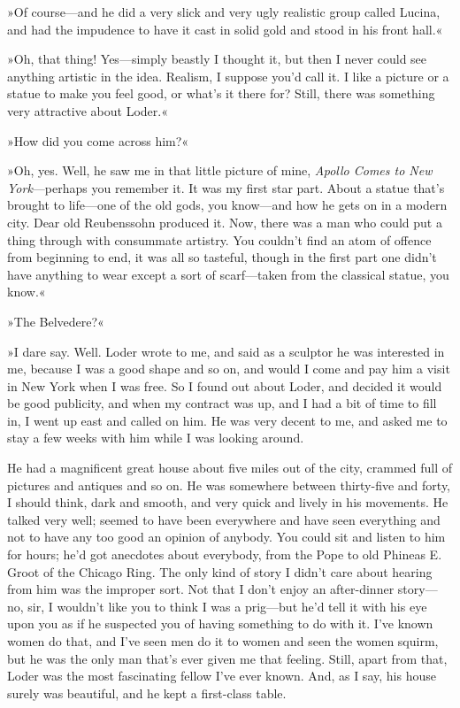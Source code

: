 »Of course—and he did a very slick and very ugly realistic group called Lucina, and had the impudence to have it cast in solid gold and stood in his front hall.«

»Oh, that thing! Yes—simply beastly I thought it, but then I never could see anything artistic in the idea. Realism, I suppose you'd call it. I like a picture or a statue to make you feel good, or what's it there for? Still, there was something very attractive about Loder.«

»How did you come across him?«

»Oh, yes. Well, he saw me in that little picture of mine, \textit{Apollo Comes to New York}—perhaps you remember it. It was my first star part. About a statue that's brought to life—one of the old gods, you know—and how he gets on in a modern city. Dear old Reubenssohn produced it. Now, there was a man who could put a thing through with consummate artistry. You couldn't find an atom of offence from beginning to end, it was all so tasteful, though in the first part one didn't have anything to wear except a sort of scarf—taken from the classical statue, you know.«

»The Belvedere?«

»I dare say. Well. Loder wrote to me, and said as a sculptor he was interested in me, because I was a good shape and so on, and would I come and pay him a visit in New York when I was free. So I found out about Loder, and decided it would be good publicity, and when my contract was up, and I had a bit of time to fill in, I went up east and called on him. He was very decent to me, and asked me to stay a few weeks with him while I was looking around.

He had a magnificent great house about five miles out of the city, crammed full of pictures and antiques and so on. He was somewhere between thirty-five and forty, I should think, dark and smooth, and very quick and lively in his movements. He talked very well; seemed to have been everywhere and have seen everything and not to have any too good an opinion of anybody. You could sit and listen to him for hours; he'd got anecdotes about everybody, from the Pope to old Phineas E\@. Groot of the Chicago Ring. The only kind of story I didn't care about hearing from him was the improper sort. Not that I don't enjoy an after-dinner story—no, sir, I wouldn't like you to think I was a prig—but he'd tell it with his eye upon you as if he suspected you of having something to do with it. I've known women do that, and I've seen men do it to women and seen the women squirm, but he was the only man that's ever given me that feeling. Still, apart from that, Loder was the most fascinating fellow I've ever known. And, as I say, his house surely was beautiful, and he kept a first-class table.

